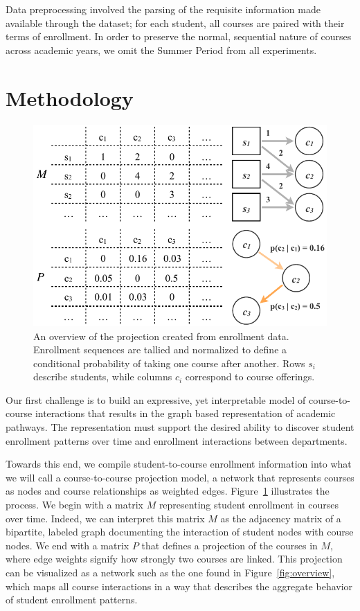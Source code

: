 Data preprocessing involved the parsing of the requisite information made available through the dataset; for each student, all courses are paired with their terms of enrollment. In order to preserve the normal, sequential nature of courses across academic years, we omit the Summer Period from all experiments. 
\section{Methodology}
\label{sec:methodology}

\begin{figure}
    \centering
    \includegraphics[width=\columnwidth]{Figs/final-simple.pdf}
    \caption{An overview of the projection created from enrollment
      data. Enrollment sequences are tallied and normalized to define
      a conditional probability of taking one course after
      another. Rows $s_i$ describe students, while columns $c_i$
      correspond to course offerings.}
    \label{fig:simple}
\end{figure}

Our first challenge is to build an expressive, yet interpretable model
of course-to-course interactions that results in the graph based
representation of academic pathways. The representation must support
the desired ability to discover student enrollment patterns over time
and enrollment interactions between departments. 

Towards this end, we compile student-to-course enrollment information
into what we will call a course-to-course projection model, a network
that represents courses as nodes and course relationships as weighted
edges. Figure~\ref{fig:simple} illustrates the process. We begin with
a matrix $M$ representing student enrollment in courses over
time. Indeed, we can interpret this matrix $M$ as the adjacency matrix
of a bipartite, labeled graph documenting the interaction of student
nodes with course nodes.  We end with a matrix $P$ that defines a
projection of the courses in $M$, where edge weights signify how
strongly two courses are linked. This projection can be visualized as a network such as the one found in Figure~\ref{fig:overview}, which maps all course interactions in a way that describes the aggregate behavior of student enrollment patterns.

